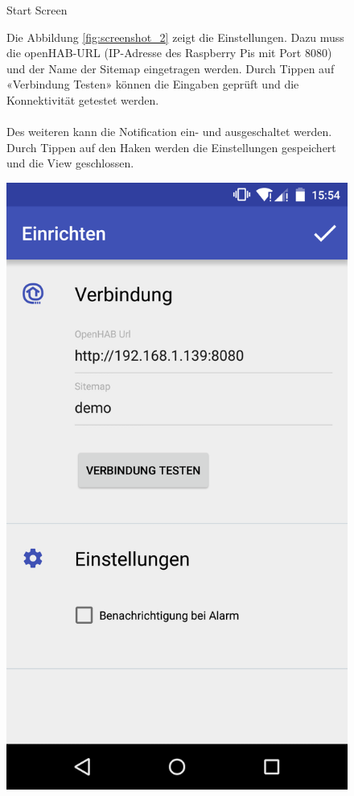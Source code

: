 \begin{figure}[htbp]
\begin{minipage}{0.32\textwidth}
		\caption{Start Screen}
		\label{fig:screenshot_1}
	\end{minipage}
\end{figure}

\begin{figure}[htbp]
	\begin{minipage}{0.6\textwidth} 
Die Abbildung \ref{fig:screenshot_2} zeigt die Einstellungen. Dazu muss die openHAB-URL (IP-Adresse des Raspberry Pis mit Port 8080) und der Name der Sitemap eingetragen werden. Durch Tippen auf «Verbindung Testen» können die Eingaben geprüft und die Konnektivität getestet werden. \\ \\
Des weiteren kann die Notification ein- und ausgeschaltet werden. Durch Tippen auf den Haken werden die Einstellungen gespeichert und die View geschlossen.
	\end{minipage}
	\hfill
	\begin{minipage}{0.32\textwidth}
		\includegraphics[scale=0.12]{appendix/img/AppScreenshots/Screenshot2}

\end{minipage}
\end{figure}
